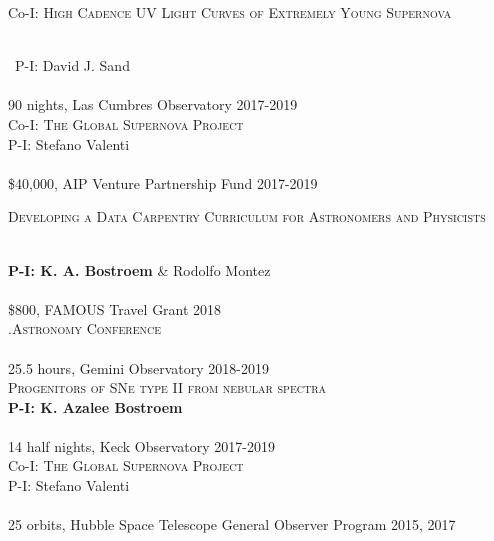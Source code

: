 \documentclass[10pt]{cv}
\begin{document}
\begin{llist}
\begin{minipage}[l]{0.7\textwidth}\vspace{0.15cm}
Co-I: \textsc{High Cadence UV Light Curves of Extremely Young Supernova}
\end{minipage}\vspace{0.15cm}\\\
P-I: David J. Sand\\
\\
90 nights, Las Cumbres Observatory \hfill 2017-2019\\
Co-I: \textsc{The Global Supernova Project}\\
P-I: Stefano Valenti \\
\\
\$40,000, AIP Venture Partnership Fund \hfill 2017-2019\\
\begin{minipage}[l]{0.7\textwidth}\vspace{0.15cm}
\textsc{Developing a Data Carpentry Curriculum for Astronomers and Physicists}
\end{minipage}\vspace{0.15cm}\\
{\bf P-I: K. A. Bostroem} \& Rodolfo Montez\\
\\
\$800, FAMOUS Travel Grant \hfill2018\\ 
\textsc{.Astronomy Conference}\\
\\
25.5 hours, Gemini Observatory \hfill 2018-2019\\
\textsc{Progenitors of SNe type II from nebular spectra}\\
{\bf P-I: K. Azalee Bostroem} \\
\\
14 half nights, Keck Observatory \hfill 2017-2019\\
Co-I: \textsc{The Global Supernova Project}\\
P-I: Stefano Valenti \\
\\
25 orbits, Hubble Space Telescope General Observer Program \hfill 2015, 2017\\ %
\begin{minipage}[l]{0.7\textwidth}\vspace{0.15cm}

\end{minipage}
\end{llist}
\end{document}
